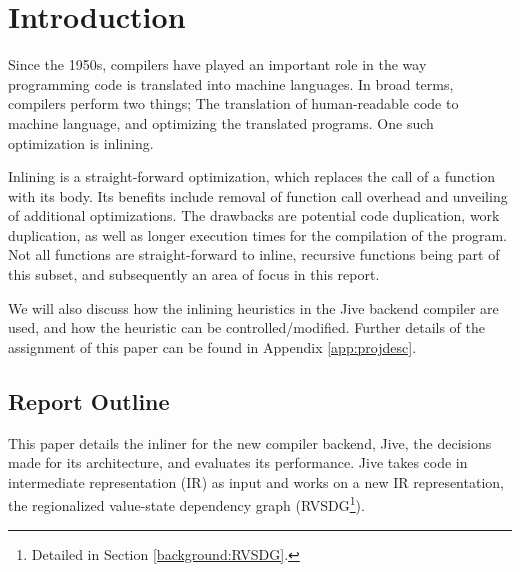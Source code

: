 
\section{Introduction}
\label{introduction}

Since the 1950s, compilers have played an important role in the way programming
code is translated into machine languages. In broad terms, compilers perform two
things; The translation of human-readable code to machine language, and
optimizing the translated programs. One such optimization is inlining.


Inlining is a straight-forward optimization, which replaces the call of a
function with its body. Its benefits include removal of function call overhead
and unveiling of additional optimizations. The drawbacks are potential code
duplication, work duplication, as well as longer execution times for the
compilation of the program. Not all functions are straight-forward to inline,
recursive functions being part of this subset, and subsequently an area of focus
in this report.

We will also discuss how the inlining heuristics in the Jive backend compiler
are used, and how the heuristic can be controlled/modified. Further details of
the assignment of this paper can be found in Appendix \ref{app:projdesc}.

\subsection{Report Outline}


This paper details the
inliner for the new compiler backend, Jive, the decisions made for its
architecture, and evaluates its performance. Jive takes code in intermediate
representation (IR) as input and works on a new IR representation, the
regionalized value-state dependency graph (RVSDG\footnote{Detailed in Section
\ref{background:RVSDG}.}).
